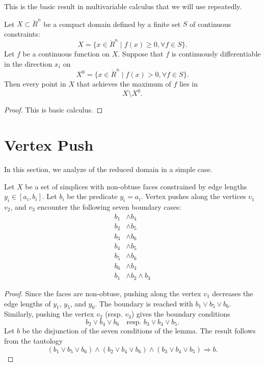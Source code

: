 This is the basic result in multivariable calculus that we will
use repeatedly.


\begin{lemma}  Let $X\subset\ring{R}^n$ be a compact domain
defined by a finite set $S$ of continuous constraints:
    $$X =\{x\in\ring{R}^n\mid f(x)\ge 0, \forall f\in S\}.$$
Let $f$ be a continuous function on $X$.  Suppose that $f$ is
continuously differentiable in the direction $x_i$ on
    $$X^0= \{x\in\ring{R}^n\mid f(x) > 0, \forall f\in S\}.$$
Then every point in $X$ that achieves the maximum of $f$ lies in
    $$X \setminus X^0.$$
\end{lemma}

\begin{proof} This is basic calculus.
\end{proof}

\section{Vertex Push}\label{sec:push}

In this section, we analyze of the reduced domain in a simple
case.

\begin{lemma}  Let $X$ be a set of simplices with non-obtuse faces constrained by edge
lengths $y_i\in[a_i,b_i]$.  Let $b_i$ be the predicate $y_i =
a_i$.  Vertex pushes along the vertices $v_1$ $v_2$, and $v_3$
encounter the following seven boundary cases:
    $$
    \begin{array}{rlll}
    b_1 &\land b_4 \\
    b_2 &\land b_5 \\
    b_3 &\land b_6 \\
    b_4 &\land b_5 \\
    b_5 &\land b_6 \\
    b_6 &\land b_4 \\
    b_1 &\land b_2 \land b_3
    \end{array}
    $$
\end{lemma}

\begin{proof} Since the faces are non-obtuse, pushing along the
vertex $v_1$ decreases the edge lengths of $y_1$, $y_5$, and
$y_6$.  The boundary is reached with $b_1\lor b_5\lor b_6$.
Similarly, pushing the vertex $v_2$ (resp. $v_3$) gives the
boundary conditions
    $$b_2\lor b_4 \lor b_6 \quad \text{resp. } b_3\lor b_4\lor
    b_5.$$
Let $b$ be the disjunction of the seven conditions of the lemma.
The result follows from the tautology
    $$
    (b_1\lor b_5\lor b_6)\land (b_2\lor b_4 \lor b_6)\land (b_3\lor b_4\lor
    b_5) \Rightarrow b.
    $$
\end{proof}

